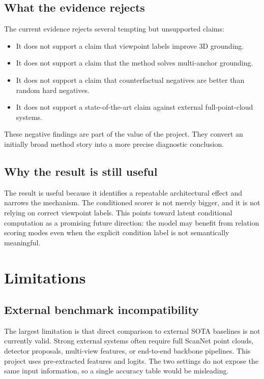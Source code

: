 \documentclass[11pt]{article}
\begin{document}
\subsection{What the evidence rejects}

The current evidence rejects several tempting but unsupported claims:
\begin{itemize}
  \item It does not support a claim that viewpoint labels improve 3D grounding.
  \item It does not support a claim that the method solves multi-anchor grounding.
  \item It does not support a claim that counterfactual negatives are better than random hard negatives.
  \item It does not support a state-of-the-art claim against external full-point-cloud systems.
\end{itemize}

These negative findings are part of the value of the project. They convert an initially broad method story into a more precise diagnostic conclusion.

\subsection{Why the result is still useful}

The result is useful because it identifies a repeatable architectural effect and narrows the mechanism. The conditioned scorer is not merely bigger, and it is not relying on correct viewpoint labels. This points toward latent conditional computation as a promising future direction: the model may benefit from relation scoring modes even when the explicit condition label is not semantically meaningful.

\section{Limitations}

\subsection{External benchmark incompatibility}

The largest limitation is that direct comparison to external SOTA baselines is not currently valid. Strong external systems often require full ScanNet point clouds, detector proposals, multi-view features, or end-to-end backbone pipelines. This project uses pre-extracted features and logits. The two settings do not expose the same input information, so a single accuracy table would be misleading.
\end{document}
